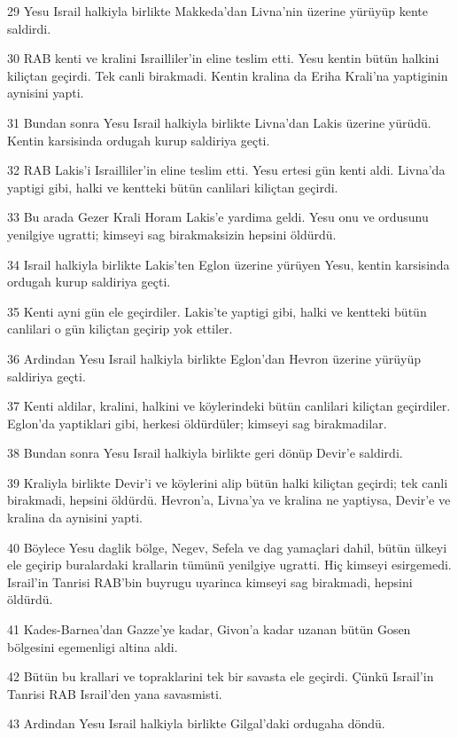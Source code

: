 \par 29 Yesu Israil halkiyla birlikte Makkeda'dan Livna'nin üzerine yürüyüp kente saldirdi.
\par 30 RAB kenti ve kralini Israilliler'in eline teslim etti. Yesu kentin bütün halkini kiliçtan geçirdi. Tek canli birakmadi. Kentin kralina da Eriha Krali'na yaptiginin aynisini yapti.
\par 31 Bundan sonra Yesu Israil halkiyla birlikte Livna'dan Lakis üzerine yürüdü. Kentin karsisinda ordugah kurup saldiriya geçti.
\par 32 RAB Lakis'i Israilliler'in eline teslim etti. Yesu ertesi gün kenti aldi. Livna'da yaptigi gibi, halki ve kentteki bütün canlilari kiliçtan geçirdi.
\par 33 Bu arada Gezer Krali Horam Lakis'e yardima geldi. Yesu onu ve ordusunu yenilgiye ugratti; kimseyi sag birakmaksizin hepsini öldürdü.
\par 34 Israil halkiyla birlikte Lakis'ten Eglon üzerine yürüyen Yesu, kentin karsisinda ordugah kurup saldiriya geçti.
\par 35 Kenti ayni gün ele geçirdiler. Lakis'te yaptigi gibi, halki ve kentteki bütün canlilari o gün kiliçtan geçirip yok ettiler.
\par 36 Ardindan Yesu Israil halkiyla birlikte Eglon'dan Hevron üzerine yürüyüp saldiriya geçti.
\par 37 Kenti aldilar, kralini, halkini ve köylerindeki bütün canlilari kiliçtan geçirdiler. Eglon'da yaptiklari gibi, herkesi öldürdüler; kimseyi sag birakmadilar.
\par 38 Bundan sonra Yesu Israil halkiyla birlikte geri dönüp Devir'e saldirdi.
\par 39 Kraliyla birlikte Devir'i ve köylerini alip bütün halki kiliçtan geçirdi; tek canli birakmadi, hepsini öldürdü. Hevron'a, Livna'ya ve kralina ne yaptiysa, Devir'e ve kralina da aynisini yapti.
\par 40 Böylece Yesu daglik bölge, Negev, Sefela ve dag yamaçlari dahil, bütün ülkeyi ele geçirip buralardaki krallarin tümünü yenilgiye ugratti. Hiç kimseyi esirgemedi. Israil'in Tanrisi RAB'bin buyrugu uyarinca kimseyi sag birakmadi, hepsini öldürdü.
\par 41 Kades-Barnea'dan Gazze'ye kadar, Givon'a kadar uzanan bütün Gosen bölgesini egemenligi altina aldi.
\par 42 Bütün bu krallari ve topraklarini tek bir savasta ele geçirdi. Çünkü Israil'in Tanrisi RAB Israil'den yana savasmisti.
\par 43 Ardindan Yesu Israil halkiyla birlikte Gilgal'daki ordugaha döndü.

